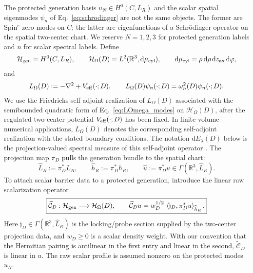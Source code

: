\documentclass[aps,prd,preprint,notitlepage,nofootinbib,superscriptaddress,floatfix]{revtex4-2}
\newcommand{\dd}{\mathrm{d}}
\newcommand{\cH}{\mathcal H}
\theoremstyle{remark}
\begin{document}
The protected generation basis \(u_N\in H^0(C,L_R)\) and the scalar spatial eigenmodes \(\psi_n\) of Eq.~\eqref{eq:schrodinger} are not the same objects.
The former are Spin\(^c\) zero modes on \(C\); the latter are eigenfunctions of a Schr\"odinger operator on the spatial two-center chart.
We reserve \(N=1,2,3\) for protected generation labels and \(n\) for scalar spectral labels.
Define
\begin{equation}
\cH_{\rm gen}
=
H^0(C,L_R),
\qquad
\cH_\Omega(D)
=
L^2(\mathbb R^3,\dd\mu_{\rm cyl}),
\qquad
\dd\mu_{\rm cyl}
=
\rho\,\dd\rho\,\dd z_{\rm ax}\,\dd\varphi,
\label{eq:gen_scalar_spaces}
\end{equation}
and
\begin{equation}
L_\Omega(D):=-\nabla^2+V_{\rm eff}(\cdot;D),
\qquad
L_\Omega(D)\psi_n(\cdot;D)
=
\omega_n^2(D)\psi_n(\cdot;D).
\label{eq:LOmega_modes}
\end{equation}
We use the Friedrichs self-adjoint realization of \(L_\Omega(D)\) associated
with the semibounded quadratic form of Eq.~\eqref{eq:LOmega_modes} on
\(\cH_\Omega(D)\), after the regulated two-center potential
\(V_{\rm eff}(\cdot;D)\) has been fixed.
In finite-volume numerical applications, \(L_\Omega(D)\) denotes the
corresponding self-adjoint realization with the stated boundary conditions.
The notation \(\dd E_\lambda(D)\) below is the projection-valued spectral
measure of this self-adjoint operator \cite{ReedSimon4}.
The projection map \(\pi_D\) pulls the generation bundle to the spatial chart:
\begin{equation}
\widehat L_R:=\pi_D^*L_R,
\qquad
\widehat h_R:=\pi_D^*h_R,
\qquad
\widehat u:=\pi_D^*u
\in
\Gamma(\mathbb R^3,\widehat L_R).
\label{eq:pullback_generation_bundle}
\end{equation}
To attach scalar barrier data to a protected generation, introduce the linear raw scalarization operator
\begin{equation}
\boxed{
\widetilde{\mathcal C}_D:\cH_{\rm gen}\longrightarrow \cH_\Omega(D),
\qquad
\widetilde{\mathcal C}_Du
=
w_D^{1/2}\,
\left\langle
\mathfrak j_D,
\pi_D^*u
\right\rangle_{\widehat h_R}.
}
\label{eq:scalarization_operator}
\end{equation}
Here \(\mathfrak j_D\in\Gamma(\mathbb R^3,\widehat L_R)\) is the locking/probe section supplied by the two-center projection data, and \(w_D\ge0\) is a scalar density weight.
With our convention that the Hermitian pairing is antilinear in the first entry and linear in the second, \(\widetilde{\mathcal C}_D\) is linear in \(u\).
The raw scalar profile is assumed nonzero on the protected modes \(u_N\).
\end{document}
